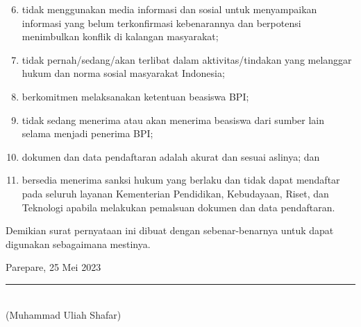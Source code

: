 \documentclass[12pt,a4paper]{lor}
\begin{document}
\begin{enumerate}
  \setcounter{enumi}{5}
\item tidak menggunakan media informasi dan sosial untuk menyampaikan informasi yang belum terkonfirmasi kebenarannya dan berpotensi menimbulkan konflik di kalangan masyarakat;
\item tidak pernah/sedang/akan terlibat dalam aktivitas/tindakan yang melanggar hukum dan norma sosial masyarakat Indonesia;
\item berkomitmen melaksanakan ketentuan beasiswa BPI;
\item tidak sedang menerima atau akan menerima beasiswa dari sumber lain selama menjadi penerima BPI;
\item dokumen dan data pendaftaran adalah akurat dan sesuai aslinya; dan
\item bersedia menerima sanksi hukum yang berlaku dan tidak dapat mendaftar pada seluruh layanan Kementerian Pendidikan, Kebudayaan, Riset, dan Teknologi apabila melakukan pemalsuan dokumen dan data pendaftaran.
\end{enumerate}    

Demikian surat pernyataan ini dibuat dengan sebenar-benarnya untuk dapat digunakan sebagaimana mestinya.
\vspace{\glueexpr\baselineskip + 0pt plus 10pt minus 5pt\relax}

\begin{flushright}

\begin{spacing}{1}
Parepare, 25 Mei 2023\\

\vspace{5em}
\rule{5cm}{1pt} \\%
(Muhammad Uliah Shafar)
\end{spacing}
\end{flushright}
\end{document}
